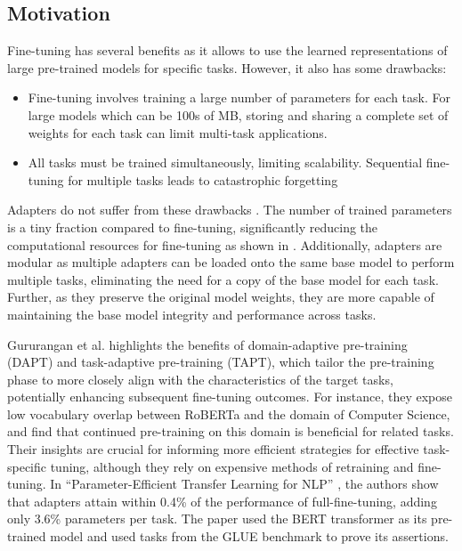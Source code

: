 \documentclass[10pt,twocolumn,letterpaper]{article}
\begin{document}
\subsection{Motivation}  
\label{sec.motivation}
Fine-tuning has several benefits as it allows to use the learned representations of large pre-trained models for specific tasks. However, it also has some drawbacks:

\begin{itemize}
    \item Fine-tuning involves training a large number of parameters for each task. For large models which can be 100s of MB, storing and sharing a complete set of weights for each task can limit multi-task applications.
    \item All tasks must be trained simultaneously, limiting scalability. Sequential fine-tuning for multiple tasks leads to catastrophic forgetting \cite{mccloskey1989catastrophic}
\end{itemize}
Adapters do not suffer from these drawbacks \cite{houlsby2019parameter}. The number of trained parameters is a tiny fraction compared to fine-tuning, significantly reducing the computational resources for fine-tuning as shown in . Additionally, adapters are modular as multiple adapters can be loaded onto the same base model to perform multiple tasks, eliminating the need for a copy of the base model for each task. Further, as they preserve the original model weights, they are more capable of maintaining the base model integrity and performance across tasks.

Gururangan et al. \cite{gururangan2020dont} highlights the benefits of domain-adaptive pre-training (DAPT) and task-adaptive pre-training (TAPT), which tailor the pre-training phase to more closely align with the characteristics of the target tasks, potentially enhancing subsequent fine-tuning outcomes. For instance, they expose low vocabulary overlap between RoBERTa and the domain of Computer Science, and find that continued pre-training on this domain is beneficial for related tasks. Their insights are crucial for informing more efficient strategies for effective task-specific tuning, although they rely on expensive methods of retraining and fine-tuning. In “Parameter-Efficient Transfer Learning for NLP” \cite{houlsby2019parameter}, the authors show that adapters attain within 0.4\% of the performance of full-fine-tuning, adding only 3.6\% parameters per task. The paper used the BERT transformer as its pre-trained model and used tasks from the GLUE benchmark to prove its assertions. 
\end{document}
